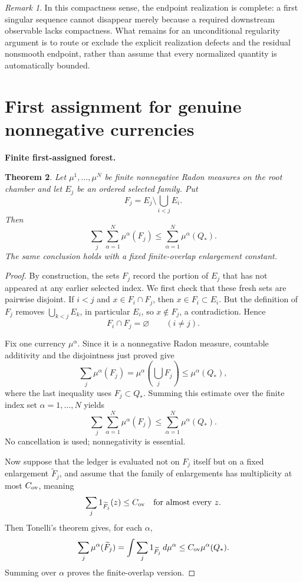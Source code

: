 \documentclass[11pt]{article}
\newtheorem{theorem}{Theorem}[section]
\theoremstyle{definition}\newtheorem{problem}[theorem]{Problem}
\theoremstyle{definition}
\theoremstyle{remark}
\newtheorem{remark}[theorem]{Remark}
\begin{document}
\begin{remark}
In this compactness sense, the endpoint realization is complete:
a first singular sequence cannot disappear merely because a required
downstream observable lacks compactness.  What remains for an unconditional
regularity argument is to route or exclude the explicit realization defects
and the residual nonsmooth endpoint, rather than assume that every normalized
quantity is automatically bounded.
\end{remark}

\section{First assignment for genuine nonnegative currencies}

\medskip
\noindent\textbf{Finite first-assigned forest.}
\begin{theorem}
Let \(\mu^1,\ldots,\mu^N\) be finite nonnegative Radon measures on the root
chamber and let \(E_j\) be an ordered selected family.  Put
\[
F_j=E_j\setminus\bigcup_{i<j}E_i.
\]
Then
\[
\boxed{
\sum_j\sum_{\alpha=1}^{N}\mu^\alpha(F_j)
\le
\sum_{\alpha=1}^{N}\mu^\alpha(Q_*).
}
\]
The same conclusion holds with a fixed finite-overlap enlargement constant.
\end{theorem}

\begin{proof}
By construction, the sets \(F_j\) record the portion of \(E_j\) that has not
appeared at any earlier selected index.  We first check that these fresh sets
are pairwise disjoint.  If \(i<j\) and \(x\in F_i\cap F_j\), then
\(x\in F_i\subset E_i\).  But the definition of \(F_j\) removes
\(\bigcup_{k<j}E_k\), in particular \(E_i\), so \(x\notin F_j\), a
contradiction.  Hence
\[
 F_i\cap F_j=\varnothing\qquad(i\ne j).
\]

Fix one currency \(\mu^\alpha\).  Since it is a nonnegative Radon measure,
countable additivity and the disjointness just proved give
\[
 \sum_j\mu^\alpha(F_j)
 =\mu^\alpha\!\left(\bigcup_jF_j\right)
 \le \mu^\alpha(Q_*),
\]
where the last inequality uses \(F_j\subset Q_*\).  Summing this estimate over
the finite index set \(\alpha=1,\ldots,N\) yields
\[
 \sum_j\sum_{\alpha=1}^N\mu^\alpha(F_j)
 \le
 \sum_{\alpha=1}^N\mu^\alpha(Q_*).
\]
No cancellation is used; nonnegativity is essential.

Now suppose that the ledger is evaluated not on \(F_j\) itself but on a fixed
enlargement \(\widetilde F_j\), and assume that the family of enlargements has
multiplicity at most \(C_{\rm ov}\), meaning
\[
 \sum_j1_{\widetilde F_j}(z)\le C_{\rm ov}
 \quad\text{for almost every }z.
\]
Then Tonelli's theorem gives, for each \(\alpha\),
\[
 \sum_j\mu^\alpha(\widetilde F_j)
 =\int\sum_j1_{\widetilde F_j}\,d\mu^\alpha
 \le C_{\rm ov}\mu^\alpha(Q_*).
\]
Summing over \(\alpha\) proves the finite-overlap version.
\end{proof}
\end{document}
